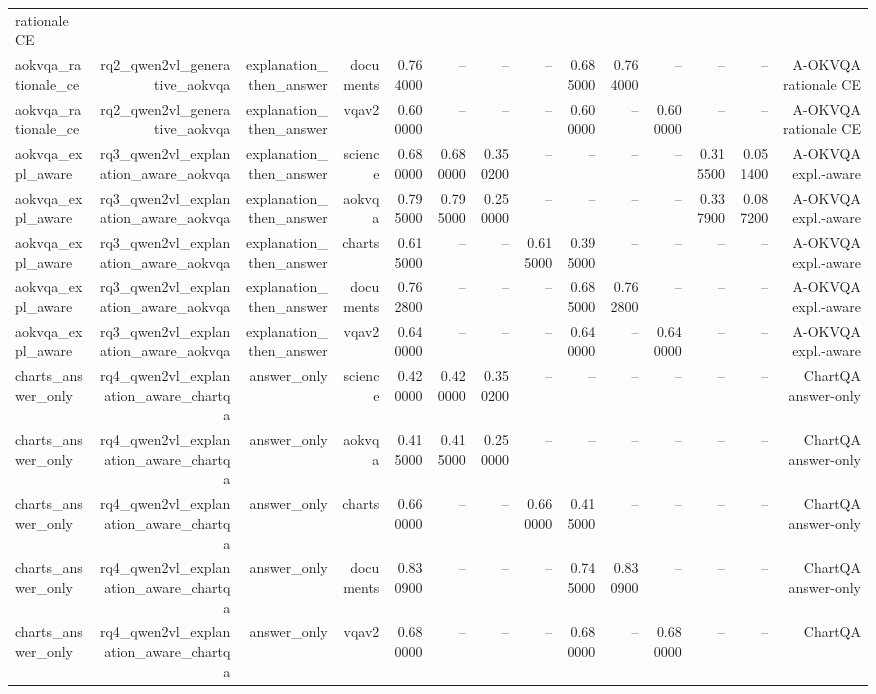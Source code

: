 \begin{table}
\begin{tabular}{lrrrrrrrrrrrrr}
rationale CE \\
aokvqa_rationale_ce & rq2_qwen2vl_generative_aokvqa & explanation_then_answer & documents & 0.764000 & -- & -- & -- & 0.685000 & 0.764000 & -- & -- & -- & A-OKVQA
rationale CE \\
aokvqa_rationale_ce & rq2_qwen2vl_generative_aokvqa & explanation_then_answer & vqav2 & 0.600000 & -- & -- & -- & 0.600000 & -- & 0.600000 & -- & -- & A-OKVQA
rationale CE \\
aokvqa_expl_aware & rq3_qwen2vl_explanation_aware_aokvqa & explanation_then_answer & science & 0.680000 & 0.680000 & 0.350200 & -- & -- & -- & -- & 0.315500 & 0.051400 & A-OKVQA
expl.-aware \\
aokvqa_expl_aware & rq3_qwen2vl_explanation_aware_aokvqa & explanation_then_answer & aokvqa & 0.795000 & 0.795000 & 0.250000 & -- & -- & -- & -- & 0.337900 & 0.087200 & A-OKVQA
expl.-aware \\
aokvqa_expl_aware & rq3_qwen2vl_explanation_aware_aokvqa & explanation_then_answer & charts & 0.615000 & -- & -- & 0.615000 & 0.395000 & -- & -- & -- & -- & A-OKVQA
expl.-aware \\
aokvqa_expl_aware & rq3_qwen2vl_explanation_aware_aokvqa & explanation_then_answer & documents & 0.762800 & -- & -- & -- & 0.685000 & 0.762800 & -- & -- & -- & A-OKVQA
expl.-aware \\
aokvqa_expl_aware & rq3_qwen2vl_explanation_aware_aokvqa & explanation_then_answer & vqav2 & 0.640000 & -- & -- & -- & 0.640000 & -- & 0.640000 & -- & -- & A-OKVQA
expl.-aware \\
charts_answer_only & rq4_qwen2vl_explanation_aware_chartqa & answer_only & science & 0.420000 & 0.420000 & 0.350200 & -- & -- & -- & -- & -- & -- & ChartQA
answer-only \\
charts_answer_only & rq4_qwen2vl_explanation_aware_chartqa & answer_only & aokvqa & 0.415000 & 0.415000 & 0.250000 & -- & -- & -- & -- & -- & -- & ChartQA
answer-only \\
charts_answer_only & rq4_qwen2vl_explanation_aware_chartqa & answer_only & charts & 0.660000 & -- & -- & 0.660000 & 0.415000 & -- & -- & -- & -- & ChartQA
answer-only \\
charts_answer_only & rq4_qwen2vl_explanation_aware_chartqa & answer_only & documents & 0.830900 & -- & -- & -- & 0.745000 & 0.830900 & -- & -- & -- & ChartQA
answer-only \\
charts_answer_only & rq4_qwen2vl_explanation_aware_chartqa & answer_only & vqav2 & 0.680000 & -- & -- & -- & 0.680000 & -- & 0.680000 & -- & -- & ChartQA

\end{tabular}
\end{table}
